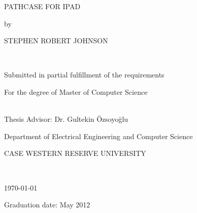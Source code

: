 \begin{titlepage}
    \begin{doublespace}
        \begin{center}
            \vspace*{0.5in}

            { \Large PATHCASE FOR IPAD }\\[0.5in]

            { \large by
            
            STEPHEN ROBERT JOHNSON }\\[0.5in]

            { \large Submitted in partial fulfillment of the requirements
            
            For the degree of Master of Computer Science}\\[0.5in]

            { \large Thesis Advisor: Dr. Gultekin \"{O}zsoyo\u{g}lu}\\[0.5in]

            { \large Department of Electrical Engineering and Computer Science
            
            CASE WESTERN RESERVE UNIVERSITY}\\[0.5in]

            \vfill

            { \large \today
            
            Graduation date: May 2012}\\[0.5in]
        \end{center}
    \end{doublespace}
\end{titlepage}
